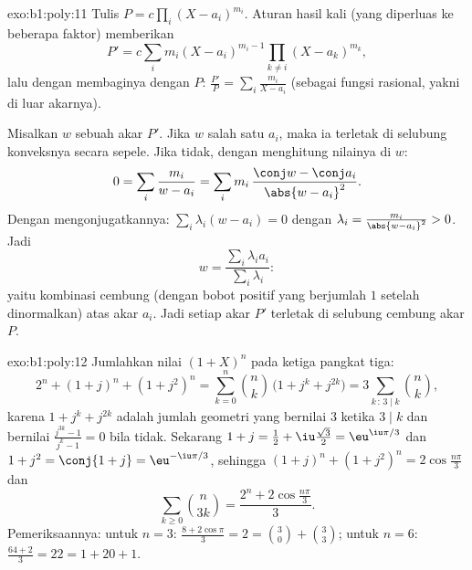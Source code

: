 \begin{solution}{exo:b1:poly:11}
Tulis $P = c\prod_i (X - a_i)^{m_i}$. Aturan hasil kali (yang diperluas ke
beberapa faktor) memberikan
\[
P' = c\sum_{i} m_i (X - a_i)^{m_i - 1} \prod_{k \neq i} (X -
a_k)^{m_k},
\]
lalu dengan membaginya dengan $P$: $\frac{P'}{P} = \sum_i \frac{m_i}{X - a_i}$
(sebagai fungsi rasional, yakni di luar akarnya).

Misalkan $w$ sebuah akar $P'$. Jika $w$ salah satu $a_i$, maka ia terletak di
selubung konveksnya secara sepele. Jika tidak, dengan menghitung nilainya di $w$:
\[
0 = \sum_i \frac{m_i}{w - a_i}
= \sum_i m_i\, \frac{\conj w - \conj a_i}{\abs{w - a_i}^2} .
\]
Dengan mengonjugatkannya: $\sum_i \lambda_i (w - a_i) = 0$ dengan $\lambda_i =
\frac{m_i}{\abs{w - a_i}^2} > 0$. Jadi
\[
w = \frac{\sum_i \lambda_i a_i}{\sum_i \lambda_i} :
\]
yaitu kombinasi cembung (dengan bobot positif yang berjumlah $1$ setelah
dinormalkan) atas akar $a_i$. Jadi setiap akar $P'$ terletak di
selubung cembung akar $P$.
\end{solution}

\begin{solution}{exo:b1:poly:12}
Jumlahkan nilai $(1 + X)^n$ pada ketiga  pangkat
tiga:
\[
2^n + (1 + j)^n + (1 + j^2)^n
= \sum_{k=0}^n \binom nk\,\bigl(1 + j^k + j^{2k}\bigr)
= 3\sum_{k\,:\,3\mid k}\binom nk ,
\]
karena $1 + j^k + j^{2k}$ adalah jumlah geometri yang bernilai $3$ ketika $3
\mid k$ dan bernilai $\frac{j^{3k} - 1}{j^k - 1} = 0$ bila tidak. Sekarang $1 +
j = \frac12 + \iu\frac{\sqrt3}2 = \eu^{\iu\pi/3}$ dan $1 + j^2 =
\conj{1 + j} = \eu^{-\iu\pi/3}$, sehingga $(1+j)^n + (1+j^2)^n =
2\cos\frac{n\pi}3$ dan
\[
\sum_{k\geq0}\binom n{3k} = \frac{2^n + 2\cos\frac{n\pi}3}{3} .
\]
Pemeriksaannya: untuk $n = 3$: $\frac{8 + 2\cos\pi}3 = 2 = \binom30 + \binom33$;
untuk $n = 6$: $\frac{64 + 2}3 = 22 = 1 + 20 + 1$.
\end{solution}

